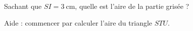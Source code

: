 
\begin{exercice}\label{exo2smath-0309}

    Sachant que $ SI=\SI{3}{\centi\meter}$, quelle est l'aire de la partie grisée ?

\begin{center}
   
\end{center}

Aide : commencer par calculer l'aire du triangle \( STU\).

\end{exercice}
